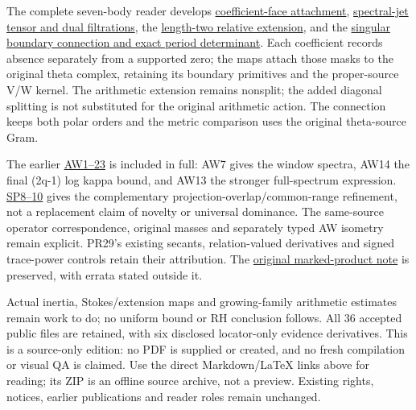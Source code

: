 \documentclass[
]{article}
\begin{document}
The complete seven-body reader develops
\href{workbenches/splitzero-tandem/continuations/20260913-accepted-followups/deligne-mixed-control/sources/MCF.tex}{coefficient-face
attachment},
\href{workbenches/splitzero-tandem/continuations/20260913-accepted-followups/deligne-mixed-control/sources/MW.tex}{spectral-jet
tensor and dual filtrations}, the
\href{workbenches/splitzero-tandem/continuations/20260913-accepted-followups/deligne-mixed-control/sources/MRE.tex}{length-two
relative extension}, and the
\href{workbenches/splitzero-tandem/continuations/20260913-accepted-followups/deligne-mixed-control/sources/BC.tex}{singular
boundary connection and exact period determinant}. Each coefficient
records absence separately from a supported zero; the maps attach those
masks to the original theta complex, retaining its boundary primitives
and the proper-source V/W kernel. The arithmetic extension remains
nonsplit; the added diagonal splitting is not substituted for the
original arithmetic action. The connection keeps both polar orders and
the metric comparison uses the original theta-source Gram.

The earlier
\href{workbenches/splitzero-tandem/continuations/20260913-accepted-followups/deligne-mixed-control/sources/AW.tex}{AW1--23}
is included in full: AW7 gives the window spectra, AW14 the final (2q-1)
log kappa bound, and AW13 the stronger full-spectrum expression.
\href{workbenches/splitzero-tandem/continuations/20260913-accepted-followups/deligne-mixed-control/sources/SP.tex}{SP8--10}
gives the complementary projection-overlap/common-range refinement, not
a replacement claim of novelty or universal dominance. The same-source
operator correspondence, original masses and separately typed AW
isometry remain explicit. PR29's existing secants, relation-valued
derivatives and signed trace-power controls retain their attribution.
The
\href{workbenches/splitzero-tandem/continuations/20260913-accepted-followups/deligne-mixed-control/sources/MARKED_PRODUCT_ORIGINAL_NOTE.tex}{original
marked-product note} is preserved, with errata stated outside it.

Actual inertia, Stokes/extension maps and growing-family arithmetic
estimates remain work to do; no uniform bound or RH conclusion follows.
All 36 accepted public files are retained, with six disclosed
locator-only evidence derivatives. This is a source-only edition: no PDF
is supplied or created, and no fresh compilation or visual QA is
claimed. Use the direct Markdown/LaTeX links above for reading; its ZIP
is an offline source archive, not a preview. Existing rights, notices,
earlier publications and reader roles remain unchanged.
\end{document}
